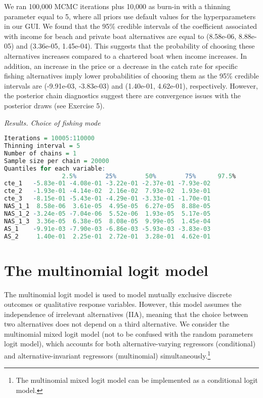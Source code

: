 We ran 100,000 MCMC iterations plus 10,000 as burn-in with a thinning parameter equal to 5, where all priors use default values for the hyperparameters in our GUI. We found that the 95\% credible intervals of the coefficient associated with income for beach and private boat alternatives are equal to  (8.58e-06, 8.88e-05) and (3.36e-05, 1.45e-04). This suggests that the probability of choosing these alternatives increases compared to a chartered boat when income increases. In addition, an increase in the price or a decrease in the catch rate for specific fishing alternatives imply lower probabilities of choosing them as the 95\% credible intervals are (-9.91e-03, -3.83e-03) and (1.40e-01, 4.62e-01), respectively. However, the posterior chain diagnostics suggest there are convergence issues with the posterior draws (see Exercise 5).

\begin{tcolorbox}[enhanced,width=4.67in,center upper,
	fontupper=\large\bfseries,drop shadow southwest,sharp corners]
	\textit{Results. Choice of fishing mode}
	\begin{VF}
		\begin{lstlisting}[language=R]	
Iterations = 10005:110000
Thinning interval = 5 
Number of chains = 1 
Sample size per chain = 20000 
Quantiles for each variable:
				2.5%        25%        50%        75%      97.5%
cte_1   -5.83e-01 -4.08e-01 -3.22e-01 -2.37e-01 -7.93e-02
cte_2   -1.93e-01 -4.14e-02  2.16e-02  7.93e-02  1.93e-01
cte_3   -8.15e-01 -5.43e-01 -4.29e-01 -3.33e-01 -1.70e-01
NAS_1_1  8.58e-06  3.61e-05  4.95e-05  6.27e-05  8.88e-05
NAS_1_2 -3.24e-05 -7.04e-06  5.52e-06  1.93e-05  5.17e-05
NAS_1_3  3.36e-05  6.38e-05  8.08e-05  9.99e-05  1.45e-04
AS_1    -9.91e-03 -7.90e-03 -6.86e-03 -5.93e-03 -3.83e-03
AS_2     1.40e-01  2.25e-01  2.72e-01  3.28e-01  4.62e-01		\end{lstlisting}
	\end{VF}
\end{tcolorbox} 


\section{The multinomial logit model}\label{sec65}

The multinomial logit model is used to model mutually exclusive discrete outcomes or qualitative response variables. However, this model assumes the independence of irrelevant alternatives (IIA), meaning that the choice between two alternatives does not depend on a third alternative. We consider the multinomial mixed logit model (not to be confused with the random parameters logit model), which accounts for both alternative-varying regressors (conditional) and alternative-invariant regressors (multinomial) simultaneously.\footnote{The multinomial mixed logit model can be implemented as a conditional logit model.}

